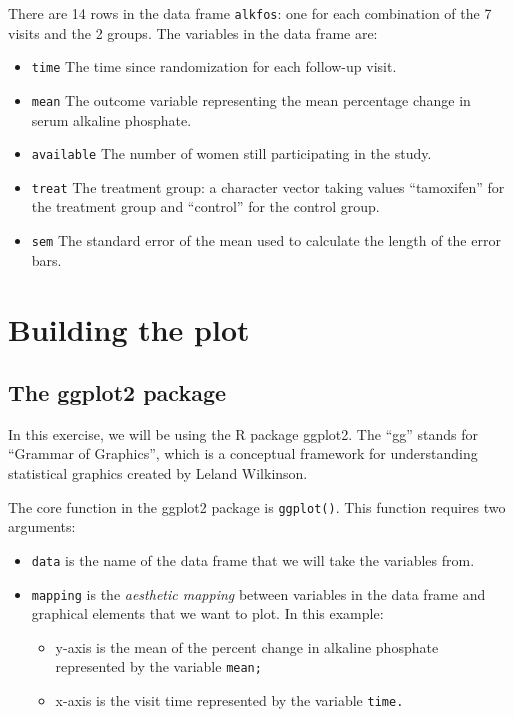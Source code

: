 \documentclass[
]{book}
\providecommand{\tightlist}{%
  \setlength{\itemsep}{0pt}\setlength{\parskip}{0pt}}
\theoremstyle{definition}
\theoremstyle{definition}
\theoremstyle{definition}
\theoremstyle{definition}
\theoremstyle{remark}
\begin{document}
There are 14 rows in the data frame \texttt{alkfos}: one for each combination of the 7 visits and the 2 groups. The variables in the data frame are:

\begin{itemize}
\tightlist
\item
  \texttt{time} The time since randomization for each follow-up visit.
\item
  \texttt{mean} The outcome variable representing the mean percentage change in serum alkaline phosphate.
\item
  \texttt{available} The number of women still participating in the study.
\item
  \texttt{treat} The treatment group: a character vector taking values ``tamoxifen'' for the treatment group and ``control'' for the control group.
\item
  \texttt{sem} The standard error of the mean used to calculate the length of the error bars.
\end{itemize}

\section{Building the plot}\label{building-the-plot}

\subsection{The ggplot2 package}\label{the-ggplot2-package}

In this exercise, we will be using the R package ggplot2. The ``gg'' stands for ``Grammar of Graphics'', which is a conceptual framework for understanding statistical graphics created by Leland Wilkinson.

The core function in the ggplot2 package is \texttt{ggplot()}. This function requires two arguments:

\begin{itemize}
\tightlist
\item
  \texttt{data} is the name of the data frame that we will take the variables from.
\item
  \texttt{mapping} is the \emph{aesthetic mapping} between variables in the data frame and graphical elements that we want to plot. In this example:

  \begin{itemize}
  \tightlist
  \item
    y-axis is the mean of the percent change in alkaline phosphate represented by the variable \texttt{mean;}
  \item
    x-axis is the visit time represented by the variable \texttt{time.}
  \end{itemize}
\end{itemize}
\end{document}
